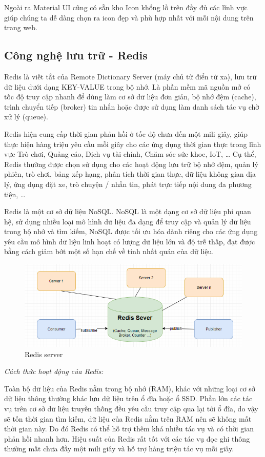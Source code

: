 Ngoài ra Material UI cũng có sẵn kho Icon khổng lồ trên đầy
đủ các lĩnh vực giúp chúng ta dễ dàng chọn ra icon đẹp và
phù hợp nhất với mỗi nội dung trên trang web.

\subsection{Công nghệ lưu trữ - Redis}
Redis là viết tắt của Remote Dictionary Server
(máy chủ từ điển từ xa), lưu trữ dữ liệu dưới dạng
KEY-VALUE trong bộ nhớ. Là phần mềm mã nguồn mở có tốc độ
truy cập nhanh để dùng làm cơ sở dữ liệu đơn giản, bộ nhớ đệm (cache),
trình chuyển tiếp (broker) tin nhắn hoặc
được sử dụng làm danh sách tác vụ chờ xử lý (queue). 

Redis hiện cung cấp thời gian phản hồi ở tốc độ chưa đến
một mili giây, giúp thực hiện hàng triệu yêu cầu mỗi giây cho
các ứng dụng thời gian thực trong lĩnh vực Trò chơi, Quảng cáo, Dịch
vụ tài chính, Chăm sóc sức khoe, IoT, … Cụ thể, Redis thường được chọn
sử dụng cho các hoạt động lưu trữ bộ nhớ đệm, quản lý phiên, trò chơi,
bảng xếp hạng, phân tích thời gian thực, dữ liệu không gian
địa lý, ứng dụng đặt xe, trò chuyện / nhắn tin, phát trực tiếp
nội dung đa phương tiện, …

Redis là một cơ sở dữ liệu NoSQL. NoSQL là một dạng cơ sở dữ liệu
phi quan hệ, sử dụng nhiều loại mô hình dữ liệu đa dạng để
truy cập và quản lý dữ liệu trong bộ nhớ và tìm kiếm, NoSQL được
tối ưu hóa dành riêng cho các ứng dụng yêu cầu mô hình dữ liệu
linh hoạt có lượng dữ liệu lớn và độ trễ thấp, đạt được bằng cách
giảm bớt một số hạn chế về tính nhất quán của dữ liệu.

\begin{figure}[H]
    \centering
    \includegraphics[width=14cm]{images/redis.png}
    \caption{Redis server}
\end{figure}

\textit{Cách thức hoạt động của Redis:}

Toàn bộ dữ liệu của Redis nằm trong bộ nhớ (RAM), khác với những loại 
cơ sở dữ liệu thông thường khác lưu dữ liệu trên ổ đĩa hoặc ổ SSD. 
Phần lớn các tác vụ trên cơ sở dữ liệu truyền thống đều yêu cầu 
truy cập qua lại tới ổ đĩa, do vậy sẽ tốn thời gian tìm kiếm, 
dữ liệu của Redis nằm trên RAM nên sẽ không mất thời gian này. 
Do đó Redis có thể hỗ trợ thêm khá nhiều tác vụ và có thời gian 
phản hồi nhanh hơn. Hiệu suất của Redis rất tốt với các tác 
vụ đọc ghi thông thường mất chưa đầy một mili giây và hỗ trợ 
hàng triệu tác vụ mỗi giây. 

